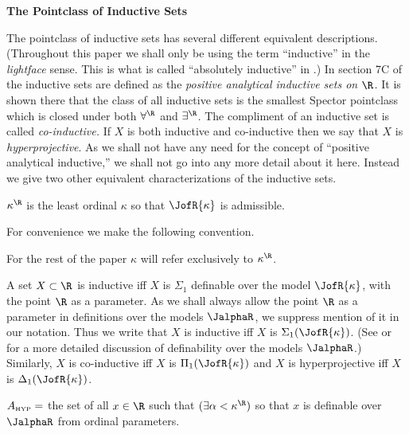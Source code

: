 \skipmed

\noindent
\textbf{The Pointclass of Inductive Sets}

\skipsmall

The pointclass of inductive sets has several different equivalent
descriptions. (Throughout this paper we shall only be using the
term ``inductive'' in the \emph{lightface} sense. This is what is
called ``absolutely inductive'' in \cite{DST}.)  In section 7C of
\cite{DST} the inductive sets are defined as the \emph{positive
analytical inductive sets on $\R$.} It is shown there that the class
of all inductive sets is the smallest Spector pointclass which is closed
under both $\forall^{\R}$ and $\exists^{\R}$. The compliment of an
inductive set is called \emph{co-inductive.} If $X$ is both inductive
and co-inductive then we say that $X$ is \emph{hyperprojective}. As we
shall not have any need for the concept of
``positive analytical inductive,'' we shall not go into any more detail
about it here. Instead we give two other equivalent  characterizations
of the inductive sets.

\begin{definition}
$\kappa^{\R}$ is the least ordinal $\kappa$ so that
$\JofR{\kappa}$ is admissible.
\end{definition}

For convenience we  make the following convention.

\begin{notation}
For the rest of the paper  $\kappa$ will refer exclusively
to $\kappa^{\R}$.
\end{notation}

 A set $X\subset\R$ is inductive iff
$X$ is $\Sigma_1$ definable over the model $\JofR{\kappa}$, with
the point $\R$ as a parameter. As we shall always allow the point
$\R$ as a parameter in definitions over the models $\JalphaR$, we suppress
mention of it in our notation. Thus we write that $X$ is inductive
iff $X$ is $\Sigma_1(\JofR{\kappa})$. (See \cite{Scales_In_LofR} or
\cite{Mouse_Sets} for a more detailed discussion of definability over
the models $\JalphaR$.) Similarly, $X$ is co-inductive iff $X$ is
$\Pi_1(\JofR{\kappa})$ and $X$ is hyperprojective iff $X$ is
$\Delta_1(\JofR{\kappa})$.

\begin{definition}
$A_{\mbox{\tiny HYP}} = $ the set of all $x\in\R$ such that
$(\exists\alpha<\kappa^{\R})$ so that $x$ is  definable over
$\JalphaR$ from ordinal parameters.
\end{definition}

